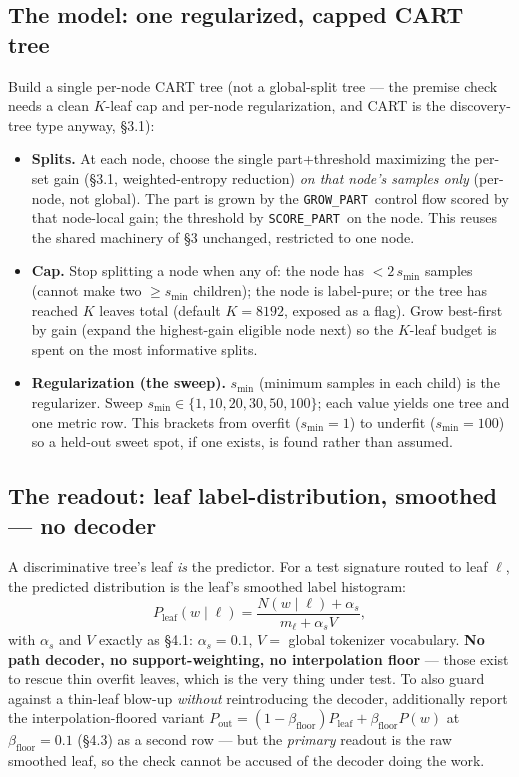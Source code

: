 \documentclass[11pt]{article}
\newcommand{\code}[1]{\texttt{#1}}
\newcommand{\score}{\code{SCORE\_PART}}
\newcommand{\grow}{\code{GROW\_PART}}
\begin{document}
\subsection{The model: one regularized, capped CART tree}
Build a single per-node CART tree (not a global-split tree --- the premise check needs a clean $K$-leaf cap and per-node regularization, and CART is the discovery-tree type anyway, \S3.1):
\begin{itemize}[nosep]
\item \textbf{Splits.} At each node, choose the single part+threshold maximizing the per-set gain (\S3.1, weighted-entropy reduction) \emph{on that node's samples only} (per-node, not global). The part is grown by the \grow\ control flow scored by that node-local gain; the threshold by \score\ on the node. This reuses the shared machinery of \S3 unchanged, restricted to one node.
\item \textbf{Cap.} Stop splitting a node when any of: the node has $<2\,s_{\min}$ samples (cannot make two $\ge s_{\min}$ children); the node is label-pure; or the tree has reached $K$ leaves total (default $K=8192$, exposed as a flag). Grow best-first by gain (expand the highest-gain eligible node next) so the $K$-leaf budget is spent on the most informative splits.
\item \textbf{Regularization (the sweep).} $s_{\min}$ (minimum samples in each child) is the regularizer. Sweep $s_{\min}\in\{1,10,20,30,50,100\}$; each value yields one tree and one metric row. This brackets from overfit ($s_{\min}=1$) to underfit ($s_{\min}=100$) so a held-out sweet spot, if one exists, is found rather than assumed.
\end{itemize}


\subsection{The readout: leaf label-distribution, smoothed --- no decoder}
A discriminative tree's leaf \emph{is} the predictor. For a test signature routed to leaf $\ell$, the predicted distribution is the leaf's smoothed label histogram:
\[
P_{\text{leaf}}(w\mid \ell)=\frac{N(w\mid\ell)+\alpha_s}{m_\ell+\alpha_s V},
\]
with $\alpha_s$ and $V$ exactly as \S4.1: $\alpha_s=0.1$, $V=$ global tokenizer vocabulary. \textbf{No path decoder, no support-weighting, no interpolation floor} --- those exist to rescue thin overfit leaves, which is the very thing under test. To also guard against a thin-leaf blow-up \emph{without} reintroducing the decoder, additionally report the interpolation-floored variant $P_{\text{out}}=(1-\beta_{\text{floor}})P_{\text{leaf}}+\beta_{\text{floor}}P(w)$ at $\beta_{\text{floor}}=0.1$ (\S4.3) as a second row --- but the \emph{primary} readout is the raw smoothed leaf, so the check cannot be accused of the decoder doing the work.
\end{document}
